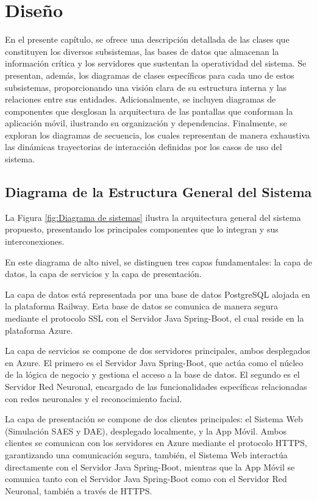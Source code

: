 \chapter{Diseño}

En el presente capítulo, se ofrece una descripción detallada de las clases que constituyen los diversos subsistemas, las bases de datos que almacenan la información crítica y los servidores que sustentan la operatividad del sistema. Se presentan, además, los diagramas de clases específicos para cada uno de estos subsistemas, proporcionando una visión clara de su estructura interna y las relaciones entre sus entidades. Adicionalmente, se incluyen diagramas de componentes que desglosan la arquitectura de las pantallas que conforman la aplicación móvil, ilustrando su organización y dependencias. Finalmente, se exploran los diagramas de secuencia, los cuales representan de manera exhaustiva las dinámicas trayectorias de interacción definidas por los casos de uso del sistema.

\section{Diagrama de la Estructura General del Sistema} 
La Figura \ref{fig:Diagrama de sistemas} ilustra la arquitectura general del sistema propuesto, presentando los principales componentes que lo integran y sus interconexiones. 

En este diagrama de alto nivel, se distinguen tres capas fundamentales: la capa de datos, la capa de servicios y la capa de presentación. 

La capa de datos está representada por una base de datos PostgreSQL alojada en la plataforma Railway. Esta base de datos se comunica de manera segura mediante el protocolo SSL con el Servidor Java Spring-Boot, el cual reside en la plataforma Azure. 

La capa de servicios se compone de dos servidores principales, ambos desplegados en Azure. El primero es el Servidor Java Spring-Boot, que actúa como el núcleo de la lógica de negocio y gestiona el acceso a la base de datos. El segundo es el Servidor Red Neuronal, encargado de las funcionalidades específicas relacionadas con redes neuronales y el reconocimiento facial. 


La capa de presentación se compone de dos clientes principales: el Sistema Web (Simulación SAES y DAE), desplegado localmente, y la App Móvil. Ambos clientes se comunican con los servidores en Azure mediante el protocolo HTTPS, garantizando una comunicación segura, también, el Sistema Web interactúa directamente con el Servidor Java Spring-Boot, mientras que la App Móvil se comunica tanto con el Servidor Java Spring-Boot como con el Servidor Red Neuronal, también a través de HTTPS.

